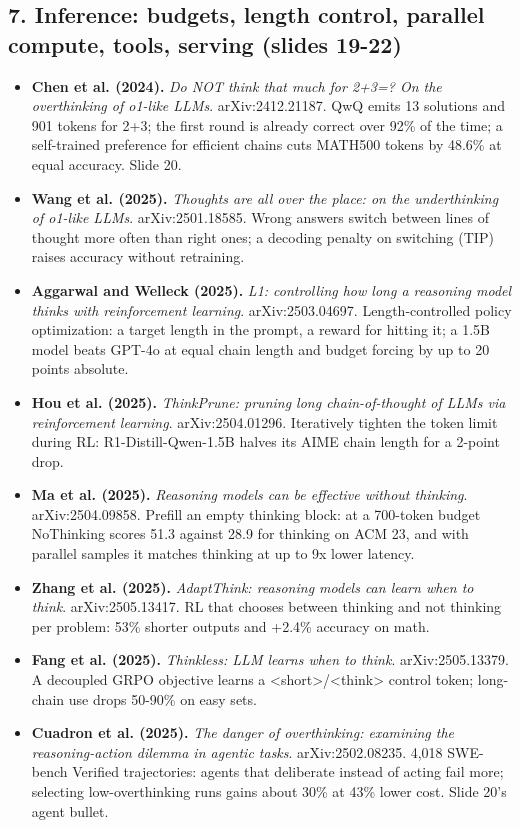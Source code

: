 \subsection*{7. Inference: budgets, length control, parallel compute, tools, serving (slides 19-22)}
\begin{itemize}[leftmargin=1.2em,itemsep=3pt]\sloppy
\item \textbf{Chen et al. (2024).} \textit{Do NOT think that much for 2+3=? On the overthinking of o1-like LLMs}. arXiv:2412.21187. QwQ emits 13 solutions and 901 tokens for 2+3; the first round is already correct over 92\% of the time; a self-trained preference for efficient chains cuts MATH500 tokens by 48.6\% at equal accuracy. Slide 20.
\item \textbf{Wang et al. (2025).} \textit{Thoughts are all over the place: on the underthinking of o1-like LLMs}. arXiv:2501.18585. Wrong answers switch between lines of thought more often than right ones; a decoding penalty on switching (TIP) raises accuracy without retraining.
\item \textbf{Aggarwal and Welleck (2025).} \textit{L1: controlling how long a reasoning model thinks with reinforcement learning}. arXiv:2503.04697. Length-controlled policy optimization: a target length in the prompt, a reward for hitting it; a 1.5B model beats GPT-4o at equal chain length and budget forcing by up to 20 points absolute.
\item \textbf{Hou et al. (2025).} \textit{ThinkPrune: pruning long chain-of-thought of LLMs via reinforcement learning}. arXiv:2504.01296. Iteratively tighten the token limit during RL: R1-Distill-Qwen-1.5B halves its AIME chain length for a 2-point drop.
\item \textbf{Ma et al. (2025).} \textit{Reasoning models can be effective without thinking}. arXiv:2504.09858. Prefill an empty thinking block: at a 700-token budget NoThinking scores 51.3 against 28.9 for thinking on ACM 23, and with parallel samples it matches thinking at up to 9x lower latency.
\item \textbf{Zhang et al. (2025).} \textit{AdaptThink: reasoning models can learn when to think}. arXiv:2505.13417. RL that chooses between thinking and not thinking per problem: 53\% shorter outputs and +2.4\% accuracy on math.
\item \textbf{Fang et al. (2025).} \textit{Thinkless: LLM learns when to think}. arXiv:2505.13379. A decoupled GRPO objective learns a <short>/<think> control token; long-chain use drops 50-90\% on easy sets.
\item \textbf{Cuadron et al. (2025).} \textit{The danger of overthinking: examining the reasoning-action dilemma in agentic tasks}. arXiv:2502.08235. 4,018 SWE-bench Verified trajectories: agents that deliberate instead of acting fail more; selecting low-overthinking runs gains about 30\% at 43\% lower cost. Slide 20's agent bullet.

\end{itemize}
